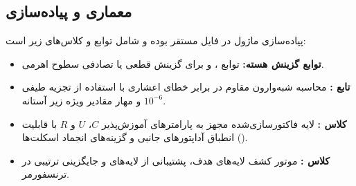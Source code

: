 \subsection{معماری و پیاده‌سازی}
پیاده‌سازی ماژول در فایل  مستقر بوده و شامل توابع و کلاس‌های زیر است:
\begin{itemize}
    \item \textbf{توابع گزینش هسته:} توابع ،  و  برای گزینش قطعی یا تصادفی سطوح اهرمی.
    \item \textbf{تابع :} محاسبه شبه‌وارون مقاوم در برابر خطای اعشاری با استفاده از تجزیه طیفی و مهار مقادیر ویژه زیر آستانه $10^{-6}$.
    \item \textbf{کلاس :} لایه فاکتورسازی‌شده  مجهز به پارامترهای آموزش‌پذیر $C$، $U$ و $R$ با قابلیت انطباق آداپتورهای جانبی  و گزینه‌های انجماد اسکلت‌ها ().
    \item \textbf{کلاس :} موتور کشف لایه‌های هدف، پشتیبانی از لایه‌های  و جایگزینی ترتیبی در ترنسفورمر.
\end{itemize}
